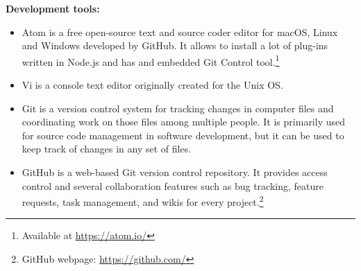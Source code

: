 \textbf{Development tools:}
\begin{itemize}
	\item {} Atom is a free open-source text and source coder editor for macOS, Linux and Windows developed by GitHub. It allows to install a lot of plug-ins written in Node.js and has and embedded Git Control tool.\footnote{Available at \url{https://atom.io/}}
	
	\item {} Vi is a console text editor originally created for the Unix \ac{OS}. 
	
	\item {} Git is a version control system for tracking changes in computer files and coordinating work on those files among multiple people. It is primarily used for source code management in software development, but it can be used to keep track of changes in any set of files.
	
	\item {} GitHub is a web-based Git version control repository. It provides access control and several collaboration features such as bug tracking, feature requests, task management, and wikis for every project.\footnote{GitHub webpage: \url{https://github.com/}}
	
	
	
\end{itemize}

